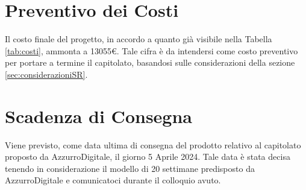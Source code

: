 \documentclass[12pt]{article}
\begin{document}
\section{Preventivo dei Costi} \label{sec:Preventivo}
Il costo finale del progetto, in accordo a quanto già visibile nella Tabella \ref{tab:costi}, ammonta a 13055€. Tale cifra è da intendersi come costo preventivo per portare a termine il capitolato, basandosi sulle considerazioni della sezione \ref{sec:considerazioniSR}.
\section{Scadenza di Consegna} \label{sec:Scadenza}
Viene previsto, come data ultima di consegna del prodotto relativo al capitolato proposto da AzzurroDigitale, il giorno 5 Aprile 2024. Tale data è stata decisa tenendo in considerazione il modello di 20 settimane predisposto da AzzurroDigitale e comunicatoci durante il colloquio avuto.
\begingroup
\endgroup
\end{document}
